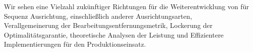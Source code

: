 Wir sehen eine Vielzahl zukünftiger Richtungen für die Weiterentwicklung von \A
für Sequenz Ausrichtung, einschließlich anderer Ausrichtungsarten,
Verallgemeinerung der Bearbeitungsentfernungsmetrik, Lockerung der
Optimalitätsgarantie, theoretische Analysen der Leistung und Effizientere
Implementierungen für den Produktionseinsatz.

\endgroup
\vfill










